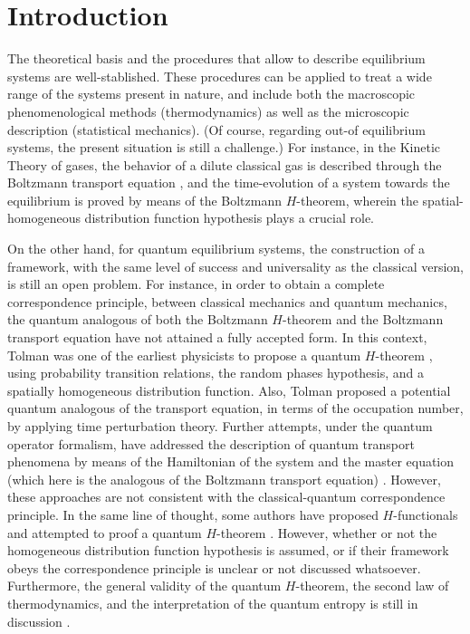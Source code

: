 \section{Introduction}

The theoretical basis and the procedures that allow to describe equilibrium systems
are well-stablished. These procedures can be applied to treat a wide range of the systems
present in nature, and include both the macroscopic phenomenological methods (thermodynamics)
as well as the microscopic description (statistical mechanics).
(Of course, regarding out-of equilibrium systems, the present situation is still a challenge.) 
For instance,
in the Kinetic Theory of gases, the behavior of a dilute classical gas
is described through the Boltzmann transport equation \cite{bib:huang},
and the time-evolution of a system towards the equilibrium is proved by
means of the Boltzmann $H$-theorem, wherein the
spatial-homogeneous distribution function hypothesis plays a crucial role.

On the other hand, for quantum equilibrium systems, the construction of a framework,
with the same level of
success and universality as the classical version, is still an open problem. For instance,
in order to obtain a complete correspondence principle, between classical mechanics
and quantum mechanics, the quantum analogous of both the Boltzmann $H$-theorem
and the Boltzmann transport equation have not attained a fully accepted form.
In this context, Tolman was one of the earliest physicists to propose a quantum
$H$-theorem \cite{bib:tolman}, using probability transition relations, the random
phases hypothesis, and a spatially homogeneous distribution function.
Also, Tolman proposed a potential quantum analogous of the transport equation,
in terms of the occupation number,
by applying time perturbation theory. Further attempts, under the quantum operator
formalism, have addressed the description of quantum transport phenomena by means of the Hamiltonian
of the system and the master equation (which here is the analogous
of the Boltzmann transport equation)
\cite{bib:grabert1974,%
bib:angel2017,
bib:amato2020,bib:nicacio2015,bib:hussein2014}. However, these approaches 
are not consistent with the classical-quantum correspondence principle.
In the same line of thought, some authors have proposed $H$-functionals
and attempted to proof a
quantum $H$-theorem \cite{bib:gorban2014,bib:bennaim2017,bib:silva2010,%
bib:deroeck2006,bib:acharya2019,bib:kastner2017,bib:han2015,bib:das2018,bib:vonneumann2010}.
However, whether or not the homogeneous distribution function hypothesis is assumed, or
if their framework obeys the correspondence principle is unclear or not discussed whatsoever.
Furthermore, the general validity
of the quantum $H$-theorem, the second law of thermodynamics, and the
interpretation of the quantum entropy is still in discussion %
\cite{bib:silva2010,bib:acharya2019,bib:kastner2017,bib:han2015,bib:brown2008,%
bib:dragoljub2009,bib:vonneumann2010,%
bib:syros1999,bib:lesovik2016,
bib:lesovik2019}.

